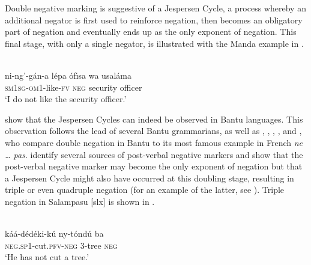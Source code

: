 \documentclass[output=paper,draft,draftmode,colorlinks,citecolor=brown]{langscibook}
\begin{document}
Double negative marking is suggestive of a Jespersen
Cycle, a process whereby an additional negator is first used to reinforce
negation, then becomes an obligatory part of negation and eventually ends
up as the only exponent of negation. This final stage, with only a single
negator, is illustrated with the Manda example in
.

\ea\label{ex:manda-security}
\\ 
\gll ni-ng'-gán-a l{é}pa {{\'o}f{\'\i}sa wa usaláma}\\
\textsc{sm1sg}-\textsc{om}1-like-\textsc{fv} \textsc{neg} {security
officer}\\
\glt `I do not like the security officer.'
\z

\citet{DevosAuwera2013} show that the Jespersen Cycles can indeed be
observed in Bantu languages. This observation follows the lead of several
Bantu grammarians, as well as \citet[256--258]{Guldemann1996},
\citet[7]{GuldemannHagemeijer2006}, \citet[165]{Guldemann2008},
\citet[57]{Nurse2008}, and \citet[117]{Guldemann2011}, who compare double
negation in Bantu to its most famous example in French \textit{ne \ldots{}
pas}. \citet{DevosAuwera2013} identify several sources of post-verbal
negative markers and show that the post-verbal negative marker may become
the only exponent of negation but that a Jespersen Cycle might also have occurred
at this doubling stage, resulting in triple or even quadruple negation (for
an example of the latter, see \citealt{DevosTshibanda2010}). Triple negation
in Salampasu [slx] is shown in
.

\ea\label{ex:salampasu-cut} \\
\gll káá-d{é}d{é}ki-kú ny-t{\'o}ndú  ba\\
\textsc{neg.sp}1-cut.\textsc{pfv-neg} 3-tree \textsc{neg}\\
\glt `He has
not cut a tree.'
\z
\end{document}
